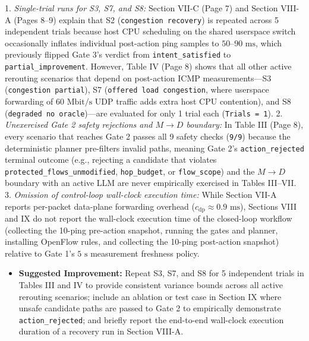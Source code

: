 \documentclass[11pt,a4paper]{article}
\begin{document}
1. \emph{Single-trial runs for S3, S7, and S8:} Section VII-C (Page 7) and Section VIII-A (Pages 8–9) explain that S2 (\texttt{congestion recovery}) is repeated across 5 independent trials because host CPU scheduling on the shared userspace switch occasionally inflates individual post-action ping samples to $50\text{--}90\text{ ms}$, which previously flipped Gate 3's verdict from \texttt{intent\_satisfied} to \texttt{partial\_improvement}. However, Table IV (Page 8) shows that all other active rerouting scenarios that depend on post-action ICMP measurements—S3 (\texttt{congestion partial}), S7 (\texttt{offered load congestion}, where userspace forwarding of $60\text{ Mbit/s}$ UDP traffic adds extra host CPU contention), and S8 (\texttt{degraded no oracle})—are evaluated for only 1 trial each (\texttt{Trials = 1}).
2. \emph{Unexercised Gate 2 safety rejections and $M \to D$ boundary:} In Table III (Page 8), every scenario that reaches Gate 2 passes all 9 safety checks (\texttt{9/9}) because the deterministic planner pre-filters invalid paths, meaning Gate 2's \texttt{action\_rejected} terminal outcome (e.g., rejecting a candidate that violates \texttt{protected\_flows\_unmodified}, \texttt{hop\_budget}, or \texttt{flow\_scope}) and the $M \to D$ boundary with an active LLM are never empirically exercised in Tables III–VII.
3. \emph{Omission of control-loop wall-clock execution time:} While Section VII-A reports per-packet data-plane forwarding overhead ($c_{\text{dp}} \approx 0.9\text{ ms}$), Sections VIII and IX do not report the wall-clock execution time of the closed-loop workflow (collecting the 10-ping pre-action snapshot, running the gates and planner, installing OpenFlow rules, and collecting the 10-ping post-action snapshot) relative to Gate 1's $5\text{ s}$ measurement freshness policy.
\begin{itemize}[leftmargin=1.8em,itemsep=2pt]
\item \textbf{Suggested Improvement:} Repeat S3, S7, and S8 for 5 independent trials in Tables III and IV to provide consistent variance bounds across all active rerouting scenarios; include an ablation or test case in Section IX where unsafe candidate paths are passed to Gate 2 to empirically demonstrate \texttt{action\_rejected}; and briefly report the end-to-end wall-clock execution duration of a recovery run in Section VIII-A.
\end{itemize}
\end{document}

